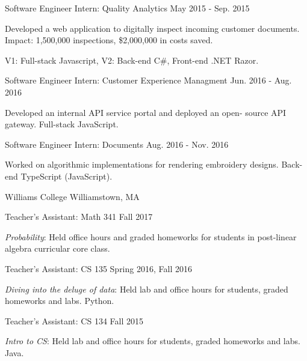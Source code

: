 \begin{cventries}
\cvexperiencebody
{Software Engineer Intern: Quality Analytics} %
{May 2015 - Sep. 2015} %
{
  \begin{cvitems} %
    \item {Developed a web application to digitally inspect incoming customer documents. Impact: 1,500,000 inspections, \$2,000,000 in costs saved.}
    \item {V1: Full-stack Javascript, V2: Back-end C\#, Front-end .NET Razor.}
  \end{cvitems}
}
\cvexperiencebody
{Software Engineer Intern: Customer Experience Managment} %
{Jun. 2016 - Aug. 2016} %
{
  \begin{cvitems} %
    \item {Developed an internal API service portal and deployed an open- source API gateway. Full-stack JavaScript. }
  \end{cvitems}
}
\cvexperiencebody
{Software Engineer Intern: Documents} %
{Aug. 2016 - Nov. 2016} %
{
  \begin{cvitems} %
    \item {Worked on algorithmic implementations for rendering embroidery designs. Back-end TypeScript (JavaScript).}
  \end{cvitems}
}
\smallskip
\cvexperienceheader
{Williams College}
{Williamstown, MA}

\cvexperiencebody
{Teacher's Assistant: Math 341}
{Fall 2017}
{\begin{cvitems}
\item \textit{Probability}: Held office hours and graded homeworks for students in post-linear algebra curricular core class.
\end{cvitems}}
\cvexperiencebody
{Teacher's Assistant: CS 135}
{Spring 2016, Fall 2016}
{\begin{cvitems}
\item \textit{Diving into the deluge of data}: Held lab and office hours for students, graded homeworks and labs. Python.
\end{cvitems}}
\cvexperiencebody
{Teacher's Assistant: CS 134}
{Fall 2015}
{\begin{cvitems}
\item \textit{Intro to CS}: Held lab and office hours for students, graded homeworks and labs. Java.
\end{cvitems}}



\end{cventries}

